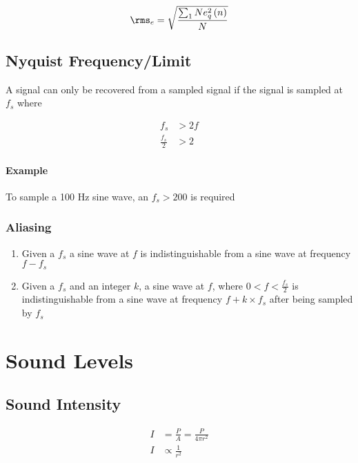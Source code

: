       \begin{equation}
        \rms_{e} = \sqrt{\frac{\sum_{1}{N} e_{q}^{2}\left( n \right)}{N}}
      \end{equation}

  \subsection{Nyquist Frequency/Limit}

    A signal can only be recovered from a sampled signal if the signal is
    sampled at $ f_{s} $ where

    \begin{align}
      f_{s} &> 2 f \\
      \frac{f_{s}}{2} &> 2
    \end{align}

    \paragraph{Example}
    To sample a 100 Hz sine wave, an $ f_{s} > 200 $ is required

    \subsubsection{Aliasing}

      \begin{enumerate}
        \item Given a $ f_{s} $ a sine wave at $ f $ is indistinguishable
        from a sine wave at frequency $ f - f_{s} $
        \item Given a $ f_{s} $ and an integer $ k $, a sine wave at
        $ f $, where $ 0 < f < \frac{f_{s}}{2} $ is indistinguishable
        from a sine wave at frequency $ f + k \times f_{s} $ after being sampled
        by $ f_{s} $
      \end{enumerate}

\section{Sound Levels}

  \subsection{Sound Intensity}

    \begin{align}
      I &= \frac{P}{A} = \frac{P}{4 \pi r^{2}} \\
      I &\propto \frac{1}{r^{2}}
    \end{align}


